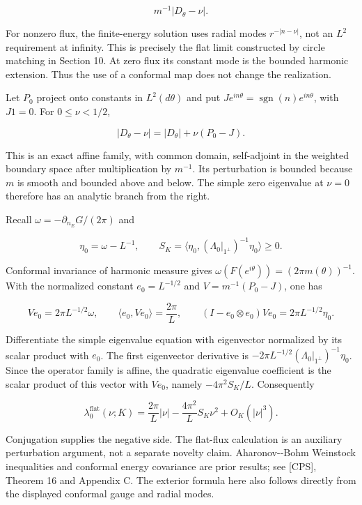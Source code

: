 \documentclass[11pt]{article}
\begin{document}
\[m^{-1}|D_\theta-\nu|.\tag{G1}\]

For nonzero flux, the finite-energy solution uses radial modes
\(r^{-|n-\nu|}\), not an \(L^2\) requirement at infinity. This is
precisely the flat limit constructed by circle matching in Section 10.
At zero flux its constant mode is the bounded harmonic extension. Thus
the use of a conformal map does not change the realization.

Let \(P_0\) project onto constants in \(L^2(d\theta)\) and put
\(J e^{in\theta}=\operatorname{sgn}(n)e^{in\theta}\), with \(J1=0\). For
\(0\leq\nu<1/2\),

\[|D_\theta-\nu|=|D_\theta|+\nu(P_0-J).\]

This is an exact affine family, with common domain, self-adjoint in the
weighted boundary space after multiplication by \(m^{-1}\). Its
perturbation is bounded because \(m\) is smooth and bounded above and
below. The simple zero eigenvalue at \(\nu=0\) therefore has an analytic
branch from the right.

Recall \(\omega=-\partial_{n_E}G/(2\pi)\) and

\[\eta_0=\omega-L^{-1},\qquad S_K=\langle\eta_0,(\Lambda_0|_{1^\perp})^{-1}\eta_0\rangle\geq0.\]

Conformal invariance of harmonic measure gives
\(\omega(F(e^{i\theta}))=(2\pi m(\theta))^{-1}\). With the normalized
constant \(e_0=L^{-1/2}\) and \(V=m^{-1}(P_0-J)\), one has

\[Ve_0=2\pi L^{-1/2}\omega,\qquad
\langle e_0,Ve_0\rangle=\frac{2\pi}{L},\qquad
(I-e_0\otimes e_0)Ve_0=2\pi L^{-1/2}\eta_0.\]

Differentiate the simple eigenvalue equation with eigenvector normalized
by its scalar product with \(e_0\). The first eigenvector derivative is
\(-2\pi L^{-1/2}(\Lambda_0|_{1^\perp})^{-1}\eta_0\). Since the operator
family is affine, the quadratic eigenvalue coefficient is the scalar
product of this vector with \(Ve_0\), namely \(-4\pi^2S_K/L\).
Consequently

\[\lambda_0^{\mathrm{flat}}(\nu;K)=\frac{2\pi}{L}|\nu|-\frac{4\pi^2}{L}S_K\nu^2+O_K(|\nu|^3).\tag{G2}\]

Conjugation supplies the negative side. The flat-flux calculation is an
auxiliary perturbation argument, not a separate novelty claim.
Aharonov-\/-Bohm Weinstock inequalities and conformal energy covariance
are prior results; see {[}CPS{]}, Theorem 16 and Appendix C. The
exterior formula here also follows directly from the displayed conformal
gauge and radial modes.
\end{document}
